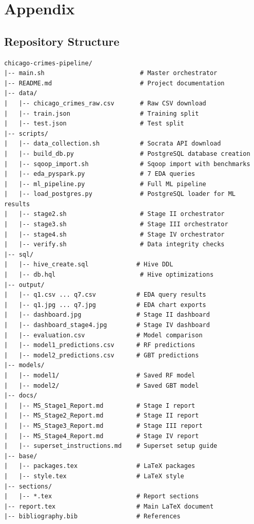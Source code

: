 \section{Appendix}

\subsection{Repository Structure}

\begin{verbatim}
chicago-crimes-pipeline/
|-- main.sh                          # Master orchestrator
|-- README.md                        # Project documentation
|-- data/
|   |-- chicago_crimes_raw.csv       # Raw CSV download
|   |-- train.json                   # Training split
|   |-- test.json                    # Test split
|-- scripts/
|   |-- data_collection.sh           # Socrata API download
|   |-- build_db.py                  # PostgreSQL database creation
|   |-- sqoop_import.sh              # Sqoop import with benchmarks
|   |-- eda_pyspark.py               # 7 EDA queries
|   |-- ml_pipeline.py               # Full ML pipeline
|   |-- load_postgres.py             # PostgreSQL loader for ML results
|   |-- stage2.sh                    # Stage II orchestrator
|   |-- stage3.sh                    # Stage III orchestrator
|   |-- stage4.sh                    # Stage IV orchestrator
|   |-- verify.sh                    # Data integrity checks
|-- sql/
|   |-- hive_create.sql             # Hive DDL
|   |-- db.hql                       # Hive optimizations
|-- output/
|   |-- q1.csv ... q7.csv           # EDA query results
|   |-- q1.jpg ... q7.jpg           # EDA chart exports
|   |-- dashboard.jpg               # Stage II dashboard
|   |-- dashboard_stage4.jpg        # Stage IV dashboard
|   |-- evaluation.csv              # Model comparison
|   |-- model1_predictions.csv      # RF predictions
|   |-- model2_predictions.csv      # GBT predictions
|-- models/
|   |-- model1/                     # Saved RF model
|   |-- model2/                     # Saved GBT model
|-- docs/
|   |-- MS_Stage1_Report.md         # Stage I report
|   |-- MS_Stage2_Report.md         # Stage II report
|   |-- MS_Stage3_Report.md         # Stage III report
|   |-- MS_Stage4_Report.md         # Stage IV report
|   |-- superset_instructions.md    # Superset setup guide
|-- base/
|   |-- packages.tex                # LaTeX packages
|   |-- style.tex                   # LaTeX style
|-- sections/
|   |-- *.tex                       # Report sections
|-- report.tex                      # Main LaTeX document
|-- bibliography.bib                # References
\end{verbatim}


